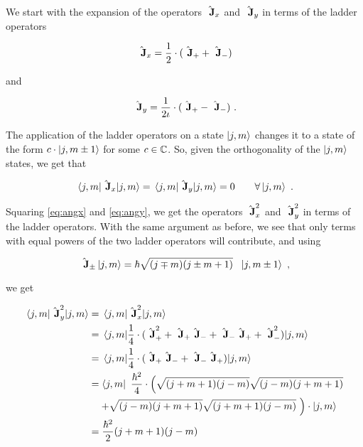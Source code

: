 

We start with the expansion of the operators $\hat{\textbf{~J}}_x$ and 
$\hat{\textbf{~J}}_y$ in terms of the ladder operators

\begin{equation}
    \hat{\textbf{~J}}_x = \frac{1}{2} \cdot (\hat{\textbf{~J}}_+ + \hat{\textbf{~J}}_-)
    \label{eq:angx}
\end{equation}

and

\begin{equation}
    \hat{\textbf{~J}}_y = \frac{1}{2\iota} \cdot (\hat{\textbf{~J}}_+ - \hat{\textbf{~J}}_-)~.
    \label{eq:angy}
\end{equation}

The application of the ladder operators on a state $\ket{j, m}$ changes it to a 
state of the form $c\cdot \ket{j, m \pm 1}$ for some $c \in \mathbb{C}$. So, given 
the orthogonality of the $\ket{j, m}$ states, we get that

\begin{equation}
    \expectationvalue{\Angularmomentum_x}{j, m} = \expectationvalue{\Angularmomentum_y}{j, m}  = 0 \qquad\forall \ket{j, m}~.
\end{equation}

Squaring \autoref{eq:angx} and \ref{eq:angy}, we get the operators $\hat{\textbf{~J}}_x ^2$
and $\hat{\textbf{~J}}_y ^2$ in terms of the ladder operators. With the same argument as before,
we see that only terms with equal powers of the two ladder operators will contribute, and using

\begin{equation}
    \hat{\textbf{~J}}_{\pm}\ket{j, m} = \hbar \sqrt{(j \mp m)(j \pm m + 1)} ~~\ket{j, m \pm 1} ~, 
\end{equation}

we get 


\begin{align}
    \expectationvalue{\Angularmomentum_y ^2}{j, m} &= \expectationvalue{\Angularmomentum_x ^2}{j, m} \\
    &= \expectationvalue{\frac{1}{4} \cdot (\Angularmomentum_+ ^2 + \Angularmomentum_+ \Angularmomentum_-
            + \Angularmomentum_- \Angularmomentum_+ + \Angularmomentum_- ^2)}{j, m} \\
    &= \expectationvalue{\frac{1}{4} \cdot (\Angularmomentum_+ \Angularmomentum_-
            + \Angularmomentum_- \Angularmomentum_+)}{j, m} \\
    &= \bra{j, m}~\frac{\hbar ^2}{4} \cdot \left(\sqrt{(j + m + 1)(j - m)}\sqrt{(j - m)(j + m + 1)} \right.\nonumber \\
        &\quad\left. + \sqrt{(j - m)(j + m + 1)}\sqrt{(j + m + 1)(j - m)}~\right) \cdot \ket{j, m} \\
    &= \frac{\hbar ^ 2}{2}(j + m + 1)(j - m)
\end{align}

